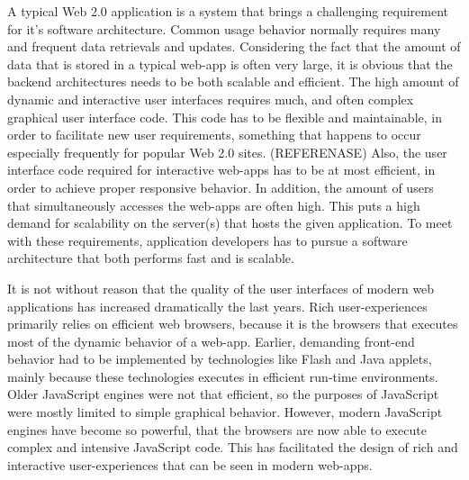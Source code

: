 A typical Web 2.0 application is a system that brings a challenging requirement for it's software                 architecture. Common usage behavior normally requires many and frequent data retrievals and updates. Considering the fact that the amount of data that is stored in a typical web-app is often very large, it is obvious that the backend architectures needs to be both scalable and efficient. The high amount of dynamic and interactive user interfaces requires much, and often complex graphical user interface code. This code has to be flexible and maintainable, in order to facilitate new user requirements, something that happens to occur especially frequently for popular Web 2.0 sites. (REFERENASE) Also, the user interface code required for interactive web-apps has to be at most efficient, in order to achieve proper responsive behavior. In addition, the amount of users that simultaneously accesses the web-apps are often high. This puts a high demand for scalability on the server(s) that hosts the given application. To meet with these requirements, application developers has to pursue a software architecture that both performs fast and is scalable. 

It is not without reason that the quality of the user interfaces of modern web applications has increased dramatically the last years. Rich user-experiences primarily relies on efficient web browsers, because it is the browsers that executes most of the dynamic behavior of a web-app. Earlier, demanding front-end behavior had to be implemented by technologies like Flash and Java applets, mainly because these technologies executes in efficient run-time environments. Older JavaScript engines were not that efficient, so the purposes of JavaScript were mostly limited to simple graphical behavior. However, modern JavaScript engines have become so powerful, that the browsers are now able to execute complex and intensive JavaScript code. This has facilitated the design of rich and interactive user-experiences that can be seen in modern web-apps.

